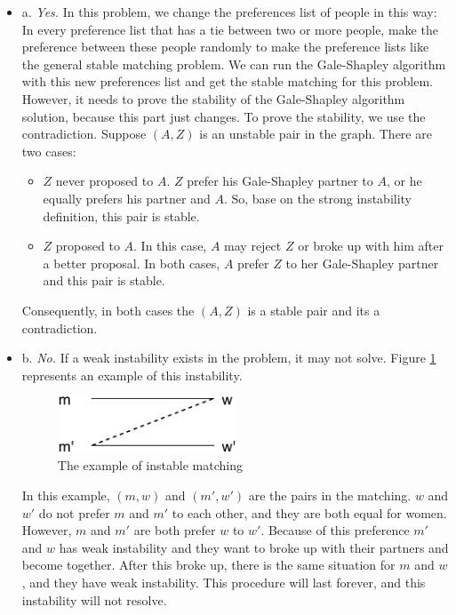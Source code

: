 \documentclass[12pt]{article}
\newenvironment{solution}[2][Solution]{\begin{trivlist}
\item[\hskip \labelsep {\bfseries #1}]}{\end{trivlist}}
\begin{document}
\begin{solution}{}
\begin{itemize}
\item a. \textit{Yes.} 
In this problem, we change the preferences list of people in this way: In every preference list that
has a tie between two or more people, make the preference between these people randomly to make the
preference lists like the general stable matching problem. We can run the Gale-Shapley algorithm with
this new preferences list and get the stable matching for this problem. However, it needs to prove 
the stability of the Gale-Shapley algorithm solution, because this part just changes.
To prove the stability, we use the contradiction. Suppose $(A,Z)$ is an unstable pair in
the graph. There are two cases:
\begin{itemize}
\item $Z$ never proposed to $A$.
$Z$ prefer his Gale-Shapley partner to $A$, or he equally prefers his partner and $A$.
So, base on the strong instability definition, this pair is stable.

\item $Z$ proposed to $A$.
In this case, $A$ may reject $Z$ or broke up with him after a better proposal.
In both cases, $A$ prefer $Z$ to her Gale-Shapley partner and this pair is stable.
\end{itemize}

Consequently, in both cases the $(A,Z)$ is a stable pair and its a contradiction.

\item b. \textit{No.}
If a weak instability exists in the problem, it may not solve. Figure \ref{fig:mot3} represents 
an example of this instability.
\begin{figure}[h]
 \centering
 \includegraphics[width=0.50\textwidth]{fig1.pdf}
 \caption{The example of instable matching
 \label{fig:mot3}}
\end{figure}
In this example, $(m,w)$ and $(m',w')$ are the pairs in the matching. $w$ and $w'$ do not prefer
$m$ and $m'$ to each other, and they are both equal for women. However, $m$ and $m'$ are both
prefer $w$ to $w'$. Because of this preference $m'$ and $w$ has weak instability and they want to
broke up with their partners and become together. After this broke up, there is the same situation
for $m$ and $w$, and they have weak instability. This procedure will last forever, and this 
instability will not resolve.

\end{itemize}

\end{solution}
\end{document}
